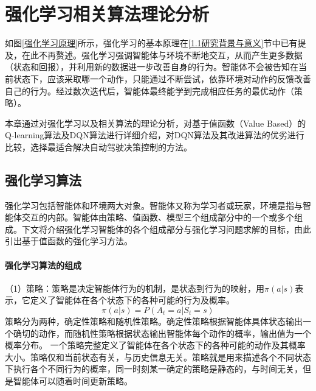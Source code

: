 %
%
%
%
%

\chapter{强化学习相关算法理论分析} %

如图\ref{强化学习原理}所示，强化学习的基本原理在\ref{1.1研究背景与意义}节中已有提及，在此不再赘述。强化学习强调智能体与环境不断地交互，从而产生更多数据（状态和回报），并利用新的数据进一步改善自身的行为。智能体不会被告知在当前状态下，应该采取哪一个动作，只能通过不断尝试，依靠环境对动作的反馈改善自己的行为。经过数次迭代后，智能体最终能学到完成相应任务的最优动作（策略）。

本章通过对强化学习以及相关算法的理论分析，对基于值函数（Value Based）的Q-learning算法及DQN算法进行详细介绍，对DQN算法及其改进算法的优劣进行比较，选择最适合解决自动驾驶决策控制的方法。

\section{强化学习算法}\label{强化学习算法} %

强化学习包括智能体和环境两大对象。智能体又称为学习者或玩家，环境是指与智能体交互的内部。智能体由策略、值函数、模型三个组成部分中的一个或多个组成。下文将介绍强化学习智能体的各个组成部分与强化学习问题求解的目标，由此引出基于值函数的强化学习方法。

\subsubsection{强化学习算法的组成} %

（1）策略：策略是决定智能体行为的机制，是状态到行为的映射，用$\pi(a|s)$表示，它定义了智能体在各个状态下的各种可能的行为及概率。
\begin{equation}\label{pi}
    \pi(a|s) = P(A_t = a | S_t = s)
\end{equation}
策略分为两种，确定性策略和随机性策略。确定性策略根据智能体具体状态输出一个确切的动作，而随机性策略根据状态输出智能体每个动作的概率，输出值为一个概率分布。
一个策略完整定义了智能体在各个状态下的各种可能的动作及其概率大小。策略仅和当前状态有关，与历史信息无关。策略就是用来描述各个不同状态下执行各个不同行为的概率，同一时刻某一确定的策略是静态的，与时间无关，但是智能体可以随着时间更新策略。

